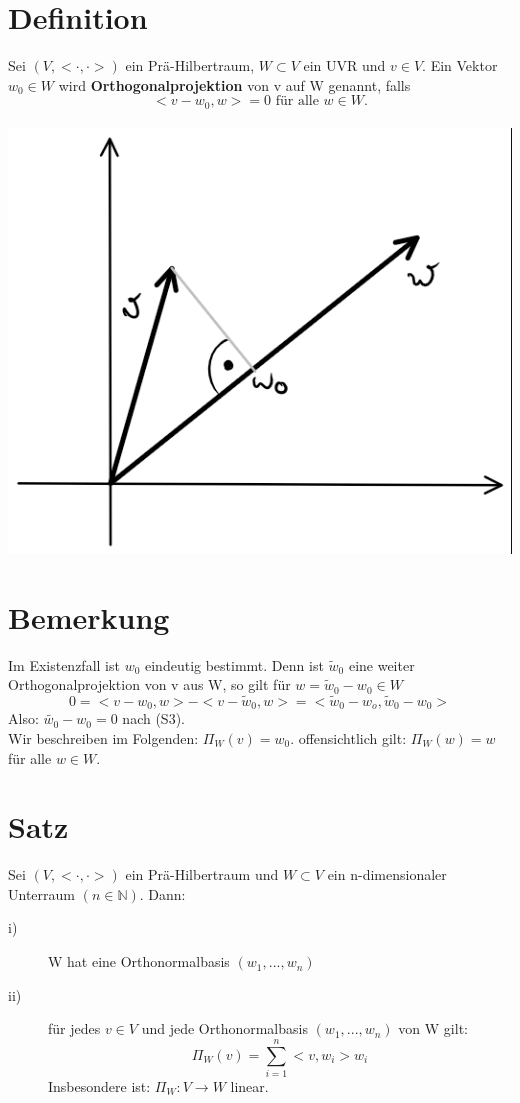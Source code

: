 \documentclass{scrbook}
\begin{document}
\section{Definition}
Sei $(V,<\cdot ,\cdot >)$ ein Prä-Hilbertraum, $W\subset V$ ein UVR und $v\in V$. Ein Vektor $w_0\in W$ wird \textbf{Orthogonalprojektion} von v auf W genannt, falls
\[<v-w_0,w> = 0 \text{ für alle } w\in W.\]
\\\includegraphics{Graph5.png}
\\
\section{Bemerkung}
Im Existenzfall ist $w_0$ eindeutig bestimmt. Denn ist $\tilde{w}_0$ eine weiter Orthogonalprojektion von v aus W, so gilt für $w = \tilde{w}_0-w_0 \in W$
\[0= <v-w_0,w> - <v-\tilde{w}_0,w> = <\tilde{w}_0-w_o,\tilde{w}_0-w_0>\]
Also: $\tilde{w_0} - w_0 = 0$ nach (S3).\\
Wir beschreiben im Folgenden: $\Pi_W(v) = w_0$.
offensichtlich gilt: $\Pi_W(w) = w$ für alle $w \in W$.
\section{Satz}
Sei $(V,<\cdot ,\cdot >)$ ein Prä-Hilbertraum und $W\subset V$ ein n-dimensionaler Unterraum $(n\in \mathbb{N})$. Dann:
\begin{description}
\item[i)] W hat eine Orthonormalbasis $(w_1,...,w_n)$
\item[ii)] für jedes $v \in V$ und jede Orthonormalbasis $(w_1,...,w_n)$ von W gilt:
\[\Pi_W(v) = \sum^n_{i=1}<v,w_i>w_i\]
Insbesondere ist: $\Pi _W :V \to W$ linear.
\end{description}
\end{document}
